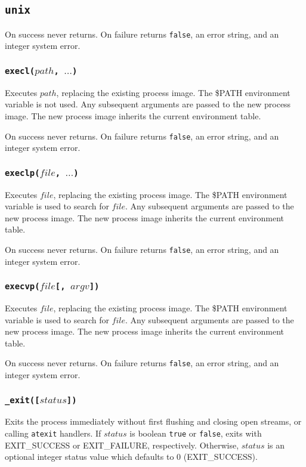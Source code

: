 \documentclass[11pt, oneside]{memoir}
\newcommand*{\true}[0]{\texttt{true}\xspace}
\newcommand*{\false}[0]{\texttt{false}\xspace}
\newcommand*{\syscall}[1]{\texttt{#1}\xspace}
\newcommand*{\fn}[1]{\texttt{#1}\xspace}
\newcounter{toccols}
\newenvironment{Module}[1]{
	\subsection{\texttt{#1}}
	\addtocontents{toc}{
		\protect\begin{multicols}{\value{toccols}}
	}
}{
	\addtocontents{toc}{\protect\end{multicols}}
}
\begin{document}
\begin{Module}{unix}
On success never returns. On failure returns \false, an error string, and an integer system error.

\subsubsection[\fn{execl}]{\fn{execl($path$, $\ldots$)}}

Executes $path$, replacing the existing process image. The \$PATH environment variable is not used. Any subsequent arguments are passed to the new process image. The new process image inherits the current environment table.

On success never returns. On failure returns \false, an error string, and an integer system error.

\subsubsection[\fn{execlp}]{\fn{execlp($file$, $\ldots$)}}

Executes $file$, replacing the existing process image. The \$PATH environment variable is used to search for $file$. Any subsequent arguments are passed to the new process image. The new process image inherits the current environment table.

On success never returns. On failure returns \false, an error string, and an integer system error.

\subsubsection[\fn{execvp}]{\fn{execvp($file$[, $argv$])}}

Executes $file$, replacing the existing process image. The \$PATH environment variable is used to search for $file$. Any subsequent arguments are passed to the new process image. The new process image inherits the current environment table.

On success never returns. On failure returns \false, an error string, and an integer system error.

\subsubsection[\fn{\_exit}]{\fn{\_exit([$status$])}}

Exits the process immediately without first flushing and closing open streams, or calling \syscall{atexit} handlers. If $status$ is boolean \true or \false, exits with EXIT\_SUCCESS or EXIT\_FAILURE, respectively. Otherwise, $status$ is an optional integer status value which defaults to 0 (EXIT\_SUCCESS).


\end{Module}
\end{document}
